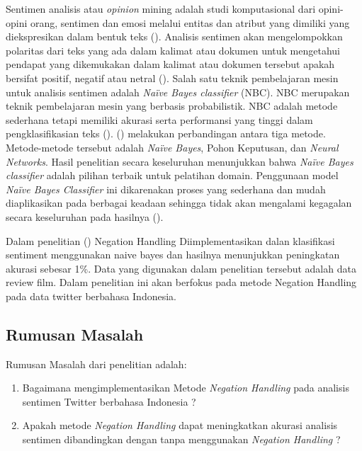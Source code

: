 Sentimen analisis atau \textit{opinion} mining adalah studi komputasional dari opini-opini orang, sentimen dan emosi melalui entitas dan atribut yang dimiliki yang diekspresikan dalam bentuk teks \citeauthor{LIU2012} (\cite*{LIU2012}). Analisis sentimen akan mengelompokkan polaritas dari teks yang ada dalam kalimat atau dokumen untuk mengetahui pendapat yang dikemukakan dalam kalimat atau dokumen tersebut apakah bersifat positif, negatif atau netral \cite{Pang+Lee+Vaithyanathan:02a} (\cite*{Pang+Lee+Vaithyanathan:02a}). Salah satu teknik pembelajaran mesin untuk analisis sentimen adalah \textit{Naïve Bayes classifier} (NBC). NBC merupakan teknik pembelajaran mesin yang berbasis probabilistik. NBC adalah metode sederhana tetapi memiliki akurasi serta performansi yang tinggi dalam pengklasifikasian teks (\cite{key:article}). \citeauthor{cogprints6708} (\citeauthor*{cogprints6708}) melakukan perbandingan antara tiga metode. Metode-metode tersebut adalah \textit{Naïve Bayes}, Pohon Keputusan, dan \textit{Neural Networks}. Hasil penelitian secara keseluruhan menunjukkan bahwa \textit{Naïve Bayes classifier} adalah pilihan terbaik untuk pelatihan domain. Penggunaan model \textit{Naïve Bayes Classifier} ini dikarenakan proses yang sederhana dan mudah diaplikasikan pada berbagai keadaan sehingga tidak akan mengalami kegagalan secara keseluruhan pada hasilnya (\cite{MANNING2008}).

Dalam penelitian \citeauthor{NARAYANAN2013} (\citeauthor*{NARAYANAN2013}) Negation Handling Diimplementasikan dalan klasifikasi sentiment menggunakan naive bayes dan hasilnya menunjukkan peningkatan akurasi sebesar 1\%. Data yang digunakan dalam penelitian tersebut adalah data review film. Dalam penelitian ini akan berfokus pada metode Negation Handling pada data twitter berbahasa Indonesia.


\subsection*{Rumusan Masalah}
Rumusan Masalah dari penelitian adalah:
\begin{enumerate}[noitemsep] 
	\item Bagaimana mengimplementasikan Metode \textit{Negation Handling} pada analisis sentimen Twitter berbahasa Indonesia ?
	\item Apakah metode \textit{Negation Handling} dapat meningkatkan akurasi analisis sentimen dibandingkan dengan tanpa menggunakan \textit{Negation Handling} ?
\end{enumerate}

